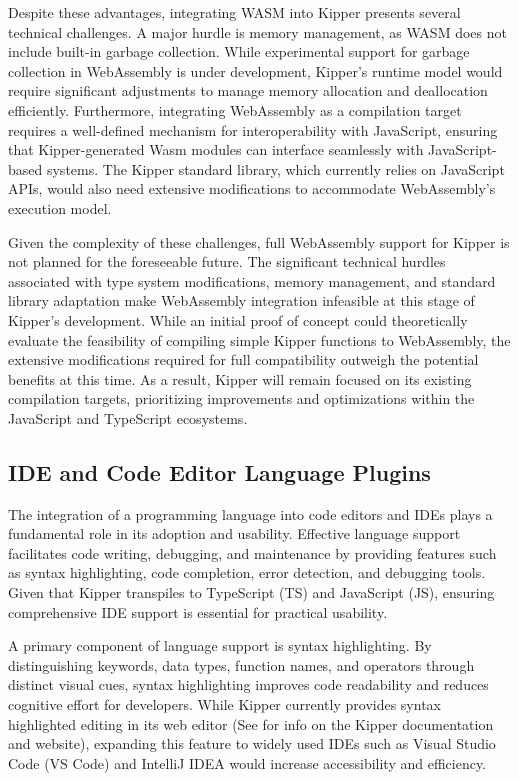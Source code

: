 Despite these advantages, integrating WASM into Kipper presents several technical challenges. A major hurdle is memory management, as WASM does not include built-in garbage collection. While experimental support for garbage collection in WebAssembly is under development, Kipper's runtime model would require significant adjustments to manage memory allocation and deallocation efficiently. Furthermore, integrating WebAssembly as a compilation target requires a well-defined mechanism for interoperability with JavaScript, ensuring that Kipper-generated Wasm modules can interface seamlessly with JavaScript-based systems. The Kipper standard library, which currently relies on JavaScript APIs, would also need extensive modifications to accommodate WebAssembly's execution model.

Given the complexity of these challenges, full WebAssembly support for Kipper is not planned for the foreseeable future. The significant technical hurdles associated with type system modifications, memory management, and standard library adaptation make WebAssembly integration infeasible at this stage of Kipper's development. While an initial proof of concept could theoretically evaluate the feasibility of compiling simple Kipper functions to WebAssembly, the extensive modifications required for full compatibility outweigh the potential benefits at this time. As a result, Kipper will remain focused on its existing compilation targets, prioritizing improvements and optimizations within the JavaScript and TypeScript ecosystems.

\subsection{IDE and Code Editor Language Plugins}

The integration of a programming language into code editors and IDEs plays a fundamental role in its adoption and usability. Effective language support facilitates code writing, debugging, and maintenance by providing features such as syntax highlighting, code completion, error detection, and debugging tools. Given that Kipper \gls{transpile}s to TypeScript (TS) and JavaScript (JS), ensuring comprehensive IDE support is essential for practical usability.

A primary component of language support is syntax highlighting. By distinguishing keywords, data types, function names, and operators through distinct visual cues, syntax highlighting improves code readability and reduces cognitive effort for developers. While Kipper currently provides syntax highlighted editing in its web editor (See  for info on the Kipper documentation and website), expanding this feature to widely used IDEs such as Visual Studio Code (VS Code) and IntelliJ IDEA would increase accessibility and efficiency.

